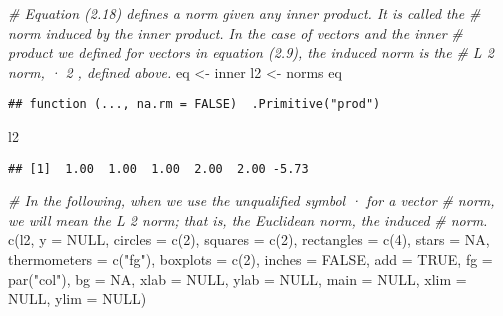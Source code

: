 \documentclass[
]{article}
\newenvironment{Shaded}{\begin{snugshade}}{\end{snugshade}}
\newcommand{\AttributeTok}[1]{\textcolor[rgb]{0.77,0.63,0.00}{#1}}
\newcommand{\CommentTok}[1]{\textcolor[rgb]{0.56,0.35,0.01}{\textit{#1}}}
\newcommand{\ConstantTok}[1]{\textcolor[rgb]{0.00,0.00,0.00}{#1}}
\newcommand{\DecValTok}[1]{\textcolor[rgb]{0.00,0.00,0.81}{#1}}
\newcommand{\FunctionTok}[1]{\textcolor[rgb]{0.00,0.00,0.00}{#1}}
\newcommand{\NormalTok}[1]{#1}
\newcommand{\OtherTok}[1]{\textcolor[rgb]{0.56,0.35,0.01}{#1}}
\newcommand{\StringTok}[1]{\textcolor[rgb]{0.31,0.60,0.02}{#1}}
\begin{document}
\begin{Shaded}
\begin{Highlighting}[]
\CommentTok{\# Equation (2.18) defines a norm given any inner product. It is called the}
\CommentTok{\# norm induced by the inner product. In the case of vectors and the inner }
\CommentTok{\# product we defined for vectors in equation (2.9), the induced norm is the }
\CommentTok{\# L 2 norm, · 2 , defined above.}
\NormalTok{eq }\OtherTok{\textless{}{-}}\NormalTok{ inner }
\NormalTok{l2 }\OtherTok{\textless{}{-}}\NormalTok{ norms }
\NormalTok{eq}
\end{Highlighting}
\end{Shaded}

\begin{verbatim}
## function (..., na.rm = FALSE)  .Primitive("prod")
\end{verbatim}

\begin{Shaded}
\begin{Highlighting}[]
\NormalTok{l2}
\end{Highlighting}
\end{Shaded}

\begin{verbatim}
## [1]  1.00  1.00  1.00  2.00  2.00 -5.73
\end{verbatim}

\begin{Shaded}
\begin{Highlighting}[]
\CommentTok{\# In the following, when we use the unqualified symbol · for a vector}
\CommentTok{\# norm, we will mean the L 2 norm; that is, the Euclidean norm, the induced}
\CommentTok{\# norm.}
\FunctionTok{c}\NormalTok{(l2, }\AttributeTok{y =} \ConstantTok{NULL}\NormalTok{, }\AttributeTok{circles =} \FunctionTok{c}\NormalTok{(}\DecValTok{2}\NormalTok{), }\AttributeTok{squares =} \FunctionTok{c}\NormalTok{(}\DecValTok{2}\NormalTok{), }\AttributeTok{rectangles =} \FunctionTok{c}\NormalTok{(}\DecValTok{4}\NormalTok{),}
        \AttributeTok{stars =} \ConstantTok{NA}\NormalTok{, }\AttributeTok{thermometers =} \FunctionTok{c}\NormalTok{(}\StringTok{"fg"}\NormalTok{), }\AttributeTok{boxplots =} \FunctionTok{c}\NormalTok{(}\DecValTok{2}\NormalTok{),}
        \AttributeTok{inches =} \ConstantTok{FALSE}\NormalTok{, }\AttributeTok{add =} \ConstantTok{TRUE}\NormalTok{, }\AttributeTok{fg =} \FunctionTok{par}\NormalTok{(}\StringTok{"col"}\NormalTok{), }\AttributeTok{bg =} \ConstantTok{NA}\NormalTok{,}
        \AttributeTok{xlab =} \ConstantTok{NULL}\NormalTok{, }\AttributeTok{ylab =} \ConstantTok{NULL}\NormalTok{, }\AttributeTok{main =} \ConstantTok{NULL}\NormalTok{, }\AttributeTok{xlim =} \ConstantTok{NULL}\NormalTok{, }\AttributeTok{ylim =} \ConstantTok{NULL}\NormalTok{)}
\end{Highlighting}
\end{Shaded}
\end{document}
